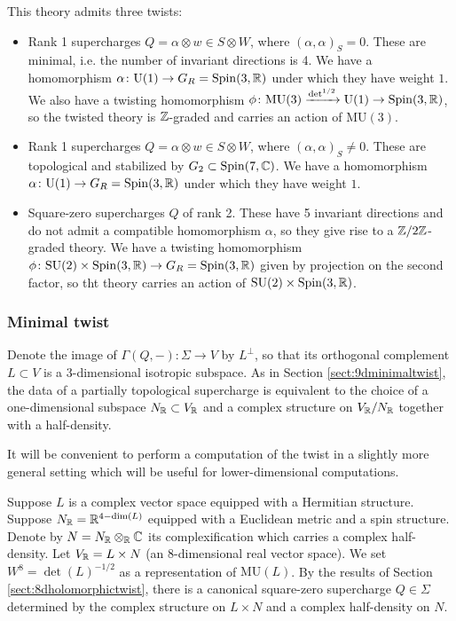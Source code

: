 \documentclass[10pt, oneside]{article}
\newcommand{\MU}{\mathrm{MU}}
\renewcommand{\U}{\mathrm{U}}
\begin{document}
This theory admits three twists:
\begin{itemize}
\item Rank 1 supercharges $Q=\alpha\otimes w\in S\otimes W$, where $(\alpha, \alpha)_S = 0$. These are minimal, i.e. the number of invariant directions is 4. We have a homomorphism $\alpha\colon \U(1)\rightarrow G_R=\Spin(3, \RR)$ under which they have weight $1$. We also have a twisting homomorphism $\phi\colon \MU(3)\xrightarrow{\det^{1/2}} \U(1)\rightarrow \Spin(3, \RR)$, so the twisted theory is $\mathbb Z$-graded and carries an action of $\MU(3)$.

\item Rank 1 supercharges $Q = \alpha \otimes w \in S \otimes W$, where $(\alpha, \alpha)_S\neq 0$. These are topological and stabilized by $G_2\subset \mathrm{Spin}(7, \mathbb C)$. We have a homomorphism $\alpha\colon \U(1)\rightarrow G_R=\Spin(3, \RR)$ under which they have weight $1$.

\item Square-zero supercharges $Q$ of rank 2. These have 5 invariant directions and do not admit a compatible homomorphism $\alpha$, so they give rise to a $\mathbb Z/2\mathbb Z$-graded theory. We have a twisting homomorphism $\phi\colon \mathrm{SU}(2)\times \mathrm{Spin}(3, \mathbb R)\rightarrow G_R=\mathrm{Spin}(3, \mathbb R)$ given by projection on the second factor, so tht theory carries an action of $\mathrm{SU}(2)\times\mathrm{Spin}(3, \mathbb R)$.
\end{itemize}

\subsubsection{Minimal twist}
\label{sect:7dminimaltwist}

Denote the image of $\Gamma(Q, -)\colon \Sigma\rightarrow V$ by $L^\perp$, so that its orthogonal complement $L\subset V$ is a 3-dimensional isotropic subspace. As in Section \ref{sect:9dminimaltwist}, the data of a partially topological supercharge is equivalent to the choice of a one-dimensional subspace $N_\mathbb R\subset V_\mathbb R$ and a complex structure on $V_\mathbb R/N_\mathbb R$ together with a half-density.

It will be convenient to perform a computation of the twist in a slightly more general setting which will be useful for lower-dimensional computations.

Suppose $L$ is a complex vector space equipped with a Hermitian structure. Suppose $N_\mathbb R=\mathbb R^{4-\dim(L)}$ equipped with a Euclidean metric and a spin structure. Denote by $N=N_\mathbb R\otimes_\mathbb R\mathbb C$ its complexification which carries a complex half-density. Let $V_\mathbb R = L\times N$ (an 8-dimensional real vector space). We set $W^8=\det(L)^{-1/2}$ as a representation of $\MU(L)$. By the results of Section \ref{sect:8dholomorphictwist}, there is a canonical square-zero supercharge $Q\in\Sigma$ determined by the complex structure on $L\times N$ and a complex half-density on $N$.
\end{document}

